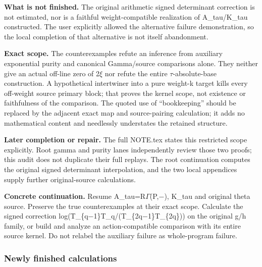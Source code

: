 \textbf{What is not finished.} The original arithmetic signed
determinant correction is not estimated, nor is a faithful
weight-compatible realization of A\_tau/K\_tau constructed. The user
explicitly allowed the alternative failure demonstration, so the local
completion of that alternative is not itself abandonment.

\textbf{Exact scope.} The counterexamples refute an inference from
auxiliary exponential purity and canonical Gamma/source comparisons
alone. They neither give an actual off-line zero of
2\allowbreak{}\ensuremath{ξ}\allowbreak{} nor refute the entire
\allowbreak{}\ensuremath{τ}\allowbreak{}-absolute-base construction. A
hypothetical intertwiner into a pure weight-k target kills every
off-weight source primary block; that proves the kernel scope, not
existence or faithfulness of the comparison. The quoted use of
``bookkeeping'' should be replaced by the adjacent exact map and
source-pairing calculation; it adds no mathematical content and
needlessly understates the retained structure.

\textbf{Later completion or repair.} The full NOTE.tex states this
restricted scope explicitly. Root gamma and purity lanes independently
review those two proofs; this audit does not duplicate their full
replays. The root continuation computes the original signed determinant
interpolation, and the two local appendices supply further
original-source calculations.

\textbf{Concrete continuation.} Resume
A\_tau=R\allowbreak{}\ensuremath{Γ}\allowbreak{}(P,\allowbreak{}\ensuremath{−}\allowbreak{}),
K\_tau and original theta source. Preserve the true counterexamples at
their exact scope. Calculate the signed correction
log(T\_\{q\allowbreak{}\ensuremath{−}\allowbreak{}1\}T\_q/(T\_\{2q\allowbreak{}\ensuremath{−}\allowbreak{}1\}T\_\{2q\}))
on the original g/h family, or build and analyze an action-compatible
comparison with its entire source kernel. Do not relabel the auxiliary
failure as whole-program failure.

\subsubsection{Newly finished
calculations}\label{newly-finished-calculations}

